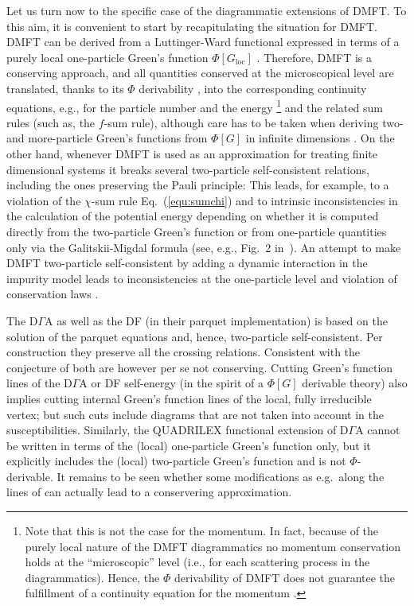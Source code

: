 \documentclass[rmp,aps,reprint,amsmath,amssymb,superscriptaddress,showpacs,nofootinbib]{revtex4-1}
\begin{document}
Let us turn now to the specific case of the diagrammatic extensions of DMFT. To this aim, it is convenient to start by recapitulating the situation for DMFT. DMFT can be derived from a Luttinger-Ward functional expressed in terms of a purely local one-particle Green's function $\Phi[G_{\text{loc}}]$ \cite{Janis92}. Therefore, DMFT is a conserving approach, and all quantities conserved at the microscopical level are translated, thanks to its $\Phi$ derivability \cite{BaymKadanoff}, into the corresponding continuity equations, e.g., for the particle number and the energy \footnote{Note that this is not the case for the momentum. In fact, because of the purely local nature of the DMFT diagrammatics no momentum conservation holds at the ``microscopic'' level (i.e., for each scattering process in the diagrammatics). Hence, the $\Phi$ derivability of DMFT does not guarantee the fulfillment of a continuity equation for the momentum \cite{Hettler2000}.} and the related sum rules (such as, the $f$-sum rule), although care has to be taken when deriving two- and more-particle Green's functions from $\Phi[G]$ in infinite dimensions \cite{Janis1999a}. On the other hand, whenever DMFT is used as an approximation for treating finite dimensional systems it breaks several two-particle self-consistent relations, including the ones preserving the Pauli principle: This leads, for example, to a violation of the $\chi$-sum rule Eq.~(\ref{equ:sumchi}) and to intrinsic inconsistencies in the calculation of the potential energy \cite{vanLoon2016,Rohringer2016} depending on whether it is computed directly from the two-particle Green's function or from one-particle quantities only via the Galitskii-Migdal formula (see, e.g., Fig.~2 in~). An attempt to make DMFT two-particle self-consistent by adding a dynamic interaction in the impurity model leads to inconsistencies at the one-particle level and violation of conservation laws \cite{Krien2017}.

The D$\Gamma$A as well as the  DF (in their parquet implementation) is based on the solution of the parquet equations and, hence,  two-particle self-consistent. Per construction they preserve  all the crossing relations. Consistent with the conjecture of  both are however per se not conserving. Cutting Green's function lines of the  D$\Gamma$A or  DF self-energy (in the spirit of a  $\Phi[G]$ derivable theory) also implies cutting internal Green's function lines of the local, fully irreducible vertex; but such cuts include diagrams that are not taken into account in the susceptibilities. Similarly, the QUADRILEX  functional extension of  D$\Gamma$A cannot be written in terms of the (local) one-particle Green's function only, but it explicitly includes the (local) two-particle Green's function and is not $\Phi$-derivable.  It remains to be seen whether  some modifications as  e.g.\ along the lines of  can actually lead to a conservering approximation.
\end{document}

